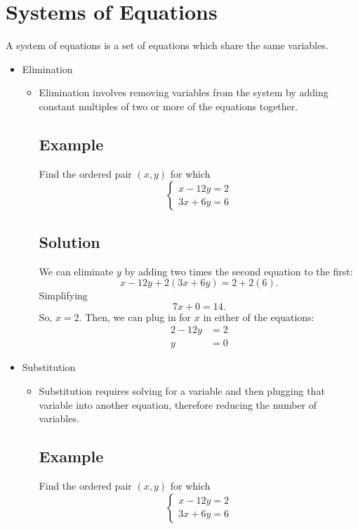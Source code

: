 \documentclass[11pt,letterpaper]{article}
\begin{document}
\begin{minipage}{\textwidth}
     \section*{Systems of Equations}
     A system of equations is a set of equations which share the same variables.
     \begin{itemize}
          \item Elimination
          \begin{itemize}
               \item  Elimination involves removing variables from the system by adding constant multiples of two or more of the equations together.
               \subsection*{Example}
               Find the ordered pair $(x,y)$ for which
               \[\left\{\begin{array}{l}x-12y=2\\3x+6y=6\end{array}\right.\]
               \subsection*{Solution}
               We can eliminate $y$ by adding two times the second equation to the first:
               \[x - 12y + 2(3x+6y)= 2 + 2(6).\]
               Simplifying
               \[7x + 0=14.\]
               So, $x=2$. Then, we can plug in for $x$ in either of the equations:
                    \begin{align*} 
                         2-12y &= 2 \\ 
                         y &= 0 
                    \end{align*}
          \end{itemize}
          \item Substitution
          \begin{itemize}
               \item Substitution requires solving for a variable and then plugging that variable into another equation, therefore reducing the number of variables.
               \subsection*{Example}
               Find the ordered pair $(x,y)$ for which
               \[\left\{\begin{array}{l}x-12y=2\\3x+6y=6\end{array}\right.\]

\end{itemize}
\end{itemize}
\end{minipage}
\end{document}

